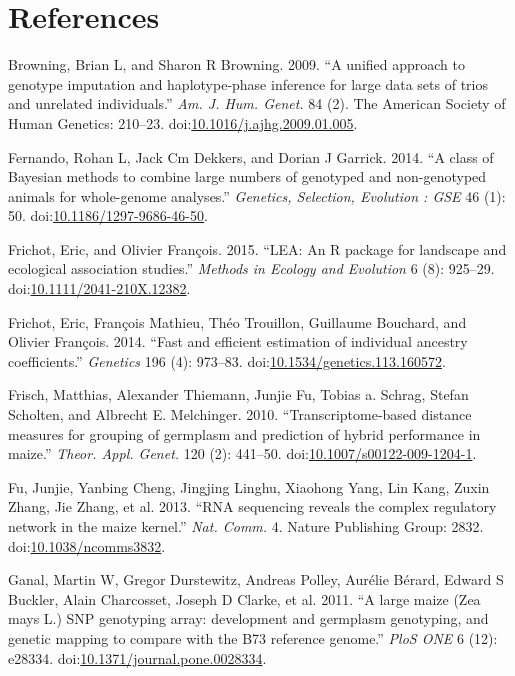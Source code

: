 \documentclass[]{elsarticle} %
\begin{document}
\section{References}\label{references}

\hypertarget{refs}{}
\hypertarget{ref-Browning2009}{}
Browning, Brian L, and Sharon R Browning. 2009. ``A unified approach to
genotype imputation and haplotype-phase inference for large data sets of
trios and unrelated individuals.'' \emph{Am. J. Hum. Genet.} 84 (2). The
American Society of Human Genetics: 210--23.
doi:\href{https://doi.org/10.1016/j.ajhg.2009.01.005}{10.1016/j.ajhg.2009.01.005}.

\hypertarget{ref-Fernando2014}{}
Fernando, Rohan L, Jack Cm Dekkers, and Dorian J Garrick. 2014. ``A
class of Bayesian methods to combine large numbers of genotyped and
non-genotyped animals for whole-genome analyses.'' \emph{Genetics,
Selection, Evolution : GSE} 46 (1): 50.
doi:\href{https://doi.org/10.1186/1297-9686-46-50}{10.1186/1297-9686-46-50}.

\hypertarget{ref-Frichot2015}{}
Frichot, Eric, and Olivier François. 2015. ``LEA: An R package for
landscape and ecological association studies.'' \emph{Methods in Ecology
and Evolution} 6 (8): 925--29.
doi:\href{https://doi.org/10.1111/2041-210X.12382}{10.1111/2041-210X.12382}.

\hypertarget{ref-Frichot2014}{}
Frichot, Eric, François Mathieu, Théo Trouillon, Guillaume Bouchard, and
Olivier François. 2014. ``Fast and efficient estimation of individual
ancestry coefficients.'' \emph{Genetics} 196 (4): 973--83.
doi:\href{https://doi.org/10.1534/genetics.113.160572}{10.1534/genetics.113.160572}.

\hypertarget{ref-Frisch2010}{}
Frisch, Matthias, Alexander Thiemann, Junjie Fu, Tobias a. Schrag,
Stefan Scholten, and Albrecht E. Melchinger. 2010. ``Transcriptome-based
distance measures for grouping of germplasm and prediction of hybrid
performance in maize.'' \emph{Theor. Appl. Genet.} 120 (2): 441--50.
doi:\href{https://doi.org/10.1007/s00122-009-1204-1}{10.1007/s00122-009-1204-1}.

\hypertarget{ref-Fu2013}{}
Fu, Junjie, Yanbing Cheng, Jingjing Linghu, Xiaohong Yang, Lin Kang,
Zuxin Zhang, Jie Zhang, et al. 2013. ``RNA sequencing reveals the
complex regulatory network in the maize kernel.'' \emph{Nat. Comm.} 4.
Nature Publishing Group: 2832.
doi:\href{https://doi.org/10.1038/ncomms3832}{10.1038/ncomms3832}.

\hypertarget{ref-Ganal2011}{}
Ganal, Martin W, Gregor Durstewitz, Andreas Polley, Aurélie Bérard,
Edward S Buckler, Alain Charcosset, Joseph D Clarke, et al. 2011. ``A
large maize (Zea mays L.) SNP genotyping array: development and
germplasm genotyping, and genetic mapping to compare with the B73
reference genome.'' \emph{PloS ONE} 6 (12): e28334.
doi:\href{https://doi.org/10.1371/journal.pone.0028334}{10.1371/journal.pone.0028334}.
\end{document}
